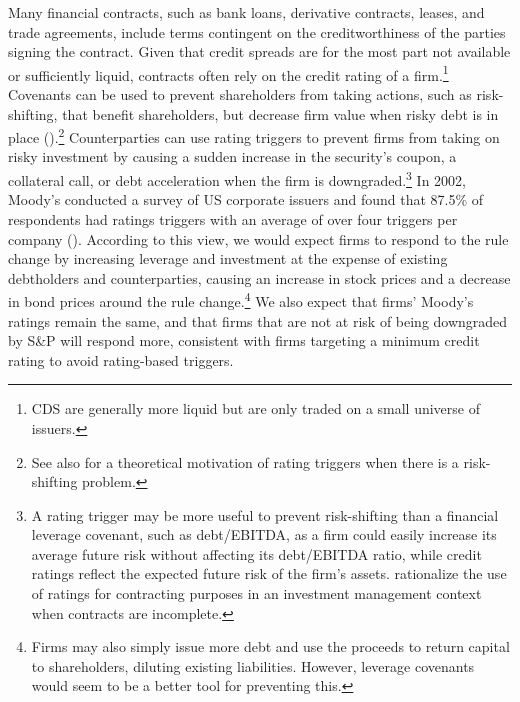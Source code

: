 \documentclass[a4paper, 12pt]{article}
\begin{document}
Many financial contracts, such as bank loans, derivative contracts, leases, and trade agreements, include terms contingent on the creditworthiness of the parties signing the contract. Given that credit spreads are for the most part not available or sufficiently liquid, contracts often rely on the credit rating of a firm.\footnote{CDS are generally more liquid but are only traded on a small universe of issuers.} Covenants can be used to prevent shareholders from taking actions, such as risk-shifting, that benefit shareholders, but decrease firm value when risky debt is in place (\citealp{smith1979financial}).\footnote{See also \cite{bhanot2006should} for a theoretical motivation of rating triggers when there is a risk-shifting problem.}  Counterparties can use rating triggers to prevent firms from taking on risky investment by causing a sudden increase in the security's coupon, a collateral call, or debt acceleration when the firm is downgraded.\footnote{
A rating trigger may be more useful to prevent risk-shifting than a financial leverage covenant, such as debt/EBITDA, as a firm could easily increase its average future risk without affecting its debt/EBITDA ratio, while credit ratings reflect the expected future risk of the firm's assets. \cite{parlour2018contracting} rationalize the use of ratings for contracting purposes in an investment management context when contracts are incomplete.}  In 2002, Moody's conducted a survey of US corporate issuers and found that 87.5\% of respondents had ratings triggers with an average of over four triggers per company (\citealp{moodytrigger2}). According to this view, we would expect firms to respond to the rule change by increasing leverage and investment at the expense of existing debtholders and counterparties, causing an increase in stock prices and a decrease in bond prices around the rule change.\footnote{Firms may also simply issue more debt and use the proceeds to return capital to shareholders, diluting existing liabilities. However, leverage covenants would seem to be a better tool for preventing this.} We also expect that firms' Moody's ratings remain the same, and that firms that are not at risk of being downgraded by S\&P will respond more, consistent with firms targeting a minimum credit rating to avoid rating-based triggers.
\end{document}
